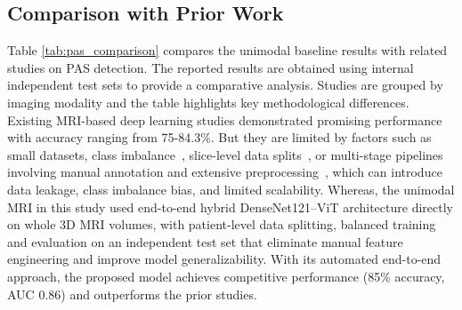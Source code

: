\documentclass[12pt]{article}
\begin{document}
\subsection{Comparison with Prior Work}

Table \ref{tab:pas_comparison} compares the unimodal baseline results with related studies on PAS detection. The reported results are obtained using internal independent test sets to provide a comparative analysis. Studies are grouped by imaging modality and the table highlights key methodological differences. Existing MRI-based deep learning studies demonstrated promising performance with accuracy ranging from 75-84.3\%. But they are limited by factors such as small datasets, class imbalance~\cite{Peng_2023}, slice-level data splits~\cite{Xu_2022}, or multi-stage pipelines involving manual annotation and extensive preprocessing~\cite{Wang_2023}, which can introduce data leakage, class imbalance bias, and limited scalability. Whereas, the unimodal MRI in this study used end-to-end hybrid DenseNet121–ViT architecture directly on whole 3D MRI volumes, with patient-level data splitting, balanced training and evaluation on an independent test set that eliminate manual feature engineering and improve model generalizability. With its automated end-to-end approach, the proposed model achieves competitive performance (85\% accuracy, AUC 0.86) and outperforms the prior studies.
\end{document}
